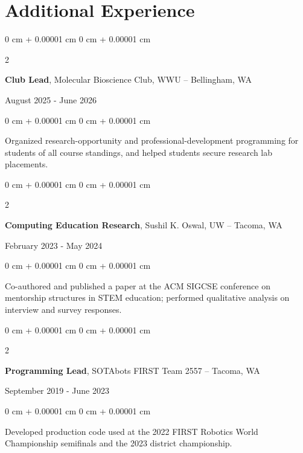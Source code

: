 \documentclass[10pt, article]{article}
\newenvironment{onecolentry}{
    \begin{adjustwidth}{
        0 cm + 0.00001 cm
    }{
        0 cm + 0.00001 cm
    }
}{
    \end{adjustwidth}
} %
\newenvironment{twocolentry}[2][]{
    \onecolentry
    \def\secondColumn{#2}
    \setcolumnwidth{\fill, 4.5 cm}
    \begin{paracol}{2}
}{
    \switchcolumn \raggedleft \secondColumn
    \end{paracol}
    \endonecolentry
} %
\begin{document}
\section{Additional Experience}

\begin{twocolentry}
	{August 2025 - June 2026}
	\textbf {Club Lead}, Molecular Bioscience Club, WWU -- Bellingham, WA
\end{twocolentry}
\begin{onecolentry}
	Organized research-opportunity and professional-development programming for students of all course standings, and helped students secure research lab placements.
\end{onecolentry}

\begin{twocolentry}
	{February 2023 - May 2024}
	\textbf{Computing Education Research}, Sushil K. Oswal, UW -- Tacoma, WA
\end{twocolentry}
\begin{onecolentry}
	Co-authored and published a paper at the ACM SIGCSE conference on mentorship structures in STEM education; performed qualitative analysis on interview and survey responses.
\end{onecolentry}

\begin{twocolentry}
	{September 2019 - June 2023}
	\textbf {Programming Lead}, SOTAbots FIRST Team 2557 -- Tacoma, WA
\end{twocolentry}
\begin{onecolentry}
	Developed production code used at the 2022 FIRST Robotics World Championship semifinals and the 2023 district championship.
\end{onecolentry}
\end{document}
